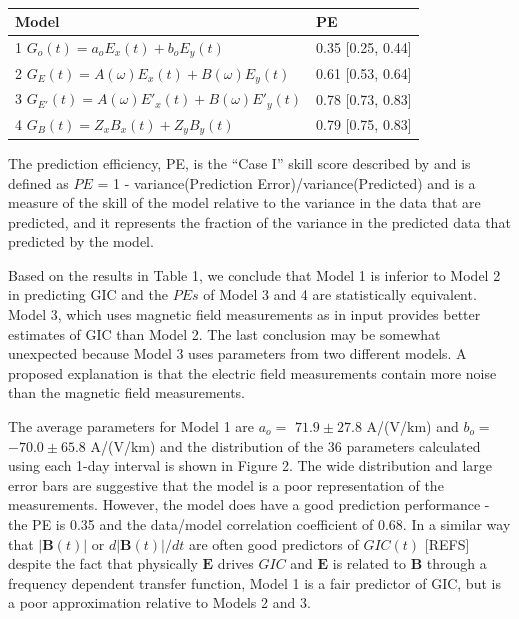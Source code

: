 \documentclass[draft,linenumbers]{agujournal2018}
\begin{document}
\begin{table}
\caption{}
\centering
\begin{tabular}{l l}
\hline
Model & PE  \\
\hline
1\hspace{1em} $G_o(t) = a_oE_x(t) + b_oE_y(t)$ & 0.35 [0.25, 0.44] \\
2\hspace{1em} $G_E(t) = A(\omega)E_x(t) + B(\omega)E_y(t)$ & 0.61 [0.53, 0.64] \\
3\hspace{1em} $G_{E'}(t) = A(\omega)E'_x(t) + B(\omega)E'_y(t)$ & 0.78 [0.73, 0.83] \\
4\hspace{1em} $G_{B}(t) = Z_xB_x(t) + Z_yB_y(t)$ & 0.79 [0.75, 0.83] \\
\hline
\end{tabular}
\end{table}

The prediction efficiency, PE, is the ``Case I'' skill score described by \cite{Murphy1988} and is defined as $PE$ = 1 - variance(Prediction Error)/variance(Predicted) and is a measure of the skill of the model relative to the variance in the data that are predicted, and it represents the fraction of the variance in the predicted data that predicted by the model.

Based on the results in Table 1, we conclude that Model 1 is inferior to Model 2 in predicting GIC and the $PEs$ of Model 3 and 4 are statistically equivalent. Model 3, which uses magnetic field measurements as in input provides better estimates of GIC than Model 2. The last conclusion may be somewhat unexpected because Model 3 uses parameters from two different models. A proposed explanation is that the electric field measurements contain more noise than the magnetic field measurements.

The average parameters for Model 1 are $a_o =$ $71.9 \pm 27.8$ A/(V/km) and $b_o =$ $-70.0 \pm 65.8$ A/(V/km) and the distribution of the 36 parameters calculated using each 1-day interval is shown in Figure 2. The wide distribution and large error bars are suggestive that the model is a poor representation of the measurements. However, the model does have a good prediction performance - the PE is 0.35 and the data/model correlation coefficient of 0.68. In a similar way that $|\mathbf{B}(t)|$ or $d|\mathbf{B}(t)|/dt$ are often good predictors of $GIC(t)$ [REFS] despite the fact that physically $\mathbf{E}$ drives $GIC$ and $\mathbf{E}$ is related to $\mathbf{B}$ through a frequency dependent transfer function, Model 1 is a fair predictor of GIC, but is a poor approximation relative to Models 2 and 3.
\end{document}
